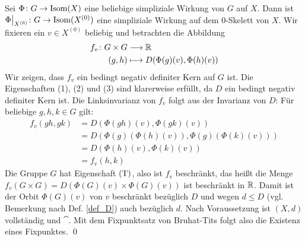 	Sei $\Phi\colon G \rightarrow \operatorname{Isom}(X)$ eine beliebige simpliziale Wirkung von $G$ auf $X$. Dann ist $\Phi\big|_{X^{(0)}}\colon G \rightarrow \operatorname{Isom}(X^{(0)})$ eine simpliziale Wirkung auf dem $0$-Skelett von $X$. Wir fixieren ein $v \in X^{(0)}$ beliebig und betrachten die Abbildung
	\begin{equation}
	\begin{aligned}
		f_v\colon G \times G &\longrightarrow \mathbb{R} \\
		(g,h) &\longmapsto D(\Phi(g)(v),\Phi(h)(v))
	\end{aligned}
	\end{equation}
	Wir zeigen, dass $f_v$ ein bedingt negativ definiter Kern auf $G$ ist. Die Eigenschaften (1), (2) und (3) sind klarerweise erfüllt, da $D$ ein bedingt negativ definiter Kern ist. Die Linksinvarianz von $f_v$ folgt aus der Invarianz von $D$: Für beliebige $g,h,k \in G$ gilt:
	\begin{equation}
	\begin{aligned}
		f_v(gh,gk) &= D(\Phi(gh)(v),\Phi(gk)(v)) \\
		&= D(\Phi(g)(\Phi(h)(v)),\Phi(g)(\Phi(k)(v))) \\
		&= D(\Phi(h)(v),\Phi(k)(v)) \\
		&= f_v(h,k)
	\end{aligned}
	\end{equation}
	Die Gruppe $G$ hat Eigenschaft $\operatorname{(T)}$, also ist $f_v$ beschränkt, das heißt die Menge\linebreak $f_v(G \times G) = D(\Phi(G)(v) \times \Phi(G)(v))$ ist beschränkt in $\mathbb{R}$. Damit ist der Orbit $\Phi(G)(v)$ von $v$ beschränkt bezüglich $D$ und wegen $d \leq D$ (vgl. Bemerkung nach Def. \ref{def_D}) auch bezüglich $d$. Nach Voraussetzung ist $(X,d)$ vollständig und $\cat$. Mit dem Fixpunktsatz von Bruhat-Tits folgt also die Existenz eines Fixpunktes. \qed
